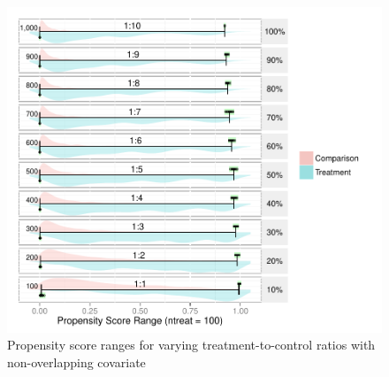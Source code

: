 \begin{singlespace}
\begin{figure}[h!]
\begin{center}
\includegraphics[width=\textwidth]{../Figures2009/PSRanges-NoOverlap.pdf}
\caption{Propensity score ranges for varying treatment-to-control ratios with non-overlapping covariate}
\end{center}
\end{figure}

\end{singlespace}



